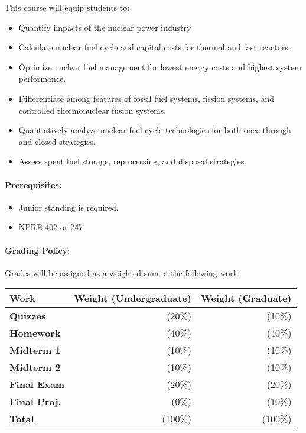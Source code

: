 \documentclass[11pt, a4paper]{article}
\begin{document}
This course will equip students to:

\begin{itemize}
\item Quantify impacts of the nuclear power industry
\item Calculate nuclear fuel cycle and capital costs for thermal and fast reactors.
\item Optimize nuclear fuel management for lowest energy costs and highest system performance.
\item Differentiate among features of fossil fuel systems, fission systems, and controlled thermonuclear fusion systems.
\item Quantiatively analyze nuclear fuel cycle technologies for both once-through and closed strategies.
\item Assess spent fuel storage, reprocessing, and disposal strategies.
\end{itemize}

\paragraph{Prerequisites:} 
\begin{itemize}
\item Junior standing is required.
\item NPRE 402 or 247
\end{itemize}

\paragraph{Grading Policy:} Grades will be assigned as a weighted sum of the 
following work.

\begin{table}[h]
\begin{tabularx}{\textwidth}{Xrr}
        \textbf{Work} & \textbf{Weight (Undergraduate)} & \textbf{Weight (Graduate)} \\
\hline
\textbf{Quizzes}     & (20\%)  & (10\%)\\
\textbf{Homework}    & (40\%)  & (40\%)\\
\textbf{Midterm 1}   & (10\%)  & (10\%)\\
\textbf{Midterm 2}   & (10\%)  & (10\%)\\
\textbf{Final Exam}  & (20\%)  & (20\%)\\
\textbf{Final Proj.} & (0\%)   & (10\%)\\
\hline
\textbf{Total}       & (100\%) & (100\%)\\
\end{tabularx}
\end{table}
\end{document}
